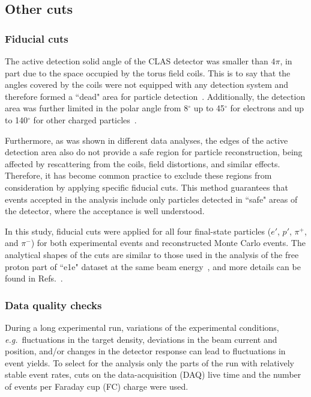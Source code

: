 \documentclass[prc,twocolumn,superscriptaddress,showpacs,amssymb,amsmath,amsfonts,aps,nofootinbib]{revtex4-1}
\begin{document}
\subsection{Other cuts}

\subsubsection{Fiducial cuts}

The active detection solid angle of the CLAS detector was smaller than $4\pi$, in part due to the space occupied by the torus field coils. This is to say that the angles covered by the coils were not equipped with any detection system and therefore formed a ``dead" area for particle detection~\cite{Mecking:2003zu}. Additionally, the detection area was further limited in the polar angle from 8$^{\circ}\mathrm{}$ up to 45$^{\circ}\mathrm{}$ for electrons and up to 140$^{\circ}\mathrm{}$ for other charged particles~\cite{Mecking:2003zu}. 

Furthermore, as was shown in different data analyses, the edges of the active detection area also do not provide a safe region for particle reconstruction, being affected by rescattering from the coils, field distortions, and similar effects. Therefore, it has become common practice to exclude these regions from consideration by applying specific fiducial cuts. This method guarantees that events accepted in the analysis include only particles detected in ``safe" areas of the detector, where the acceptance is well understood. 


In this study, fiducial cuts were applied for all four final-state particles ($e'$, $p'$, $\pi^{+}$, and $\pi^{-}$) for both experimental events and reconstructed Monte Carlo events. The analytical shapes of the cuts are similar to those used in the analysis of the free proton part of ``e1e" dataset at the same beam energy~\cite{Fed_an_note:2017,Fed_paper_2018}, and more details can be found in Refs.\!~\cite{my_an_note:2020, my_thesis:2021}.


\subsubsection{Data quality checks}

During a long experimental run, variations of the experimental conditions, {\it e.g.}~fluctuations in the target density, deviations in the beam current and position, and/or changes in the detector response can lead to fluctuations in event yields. To select for the analysis only the parts of the run with relatively stable event rates, cuts on the data-acquisition (DAQ) live time and the number of events per Faraday cup (FC) charge were used.
\end{document}
